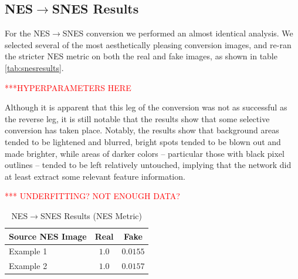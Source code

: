\documentclass[10pt,twocolumn,letterpaper]{article}
\begin{document}
\subsection{NES$\rightarrow$SNES Results}

For the NES$\rightarrow$SNES conversion we performed an almost identical analysis. We selected several of the most aesthetically pleasing conversion images, and re-ran the stricter NES metric on both the real and fake images, as shown in table \ref{tab:snesresults}. 

\textcolor{red}{***HYPERPARAMETERS HERE}

Although it is apparent that this leg of the conversion was not as successful as the reverse leg, it is still notable that the results show that some selective conversion has taken place. Notably, the results show that background areas tended to be lightened and blurred, bright spots tended to be blown out and made brighter, while areas of darker colors \--- particular those with black pixel outlines \--- tended to be left relatively untouched, implying that the network did at least extract some relevant feature information. 

\textcolor{red}{*** UNDERFITTING? NOT ENOUGH DATA?}

\begin{table}
   \begin{center}
      \begin{tabular}{|l|c|c|}
         \hline
         Source NES Image & Real  & Fake           \\
         \hline\hline
         Example 1 & $1.0$  & $0.0155$           \\
         Example 2  & $1.0$ & $0.0157$           \\
         \hline
      \end{tabular}
   \end{center}
   \caption{NES$\rightarrow$SNES Results (NES Metric)}
   \label{tab:snesresults1}
\end{table}
\end{document}
